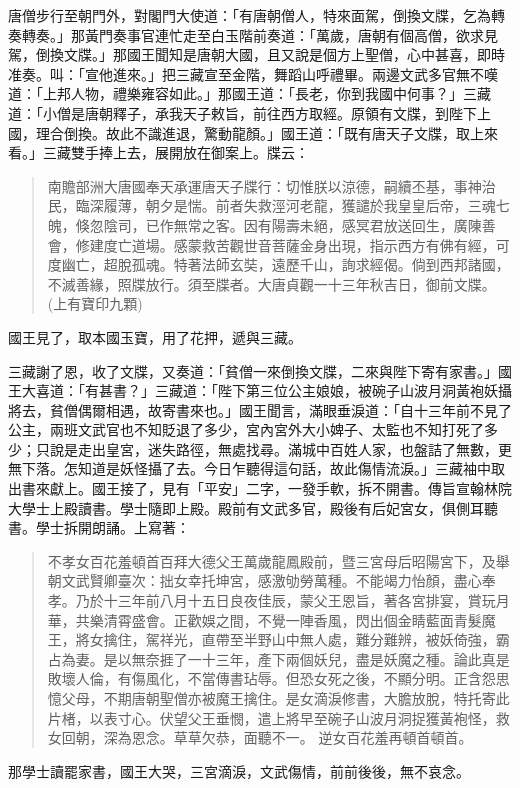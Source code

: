 唐僧步行至朝門外，對閣門大使道：「有唐朝僧人，特來面駕，倒換文牒，乞為轉奏轉奏。」那黃門奏事官連忙走至白玉階前奏道：「萬歲，唐朝有個高僧，欲求見駕，倒換文牒。」那國王聞知是唐朝大國，且又說是個方上聖僧，心中甚喜，即時准奏。叫：「宣他進來。」把三藏宣至金階，舞蹈山呼禮畢。兩邊文武多官無不嘆道：「上邦人物，禮樂雍容如此。」那國王道：「長老，你到我國中何事？」三藏道：「小僧是唐朝釋子，承我天子敕旨，前往西方取經。原領有文牒，到陛下上國，理合倒換。故此不識進退，驚動龍顏。」國王道：「既有唐天子文牒，取上來看。」三藏雙手捧上去，展開放在御案上。牒云：
\begin{quote}
南贍部洲大唐國奉天承運唐天子牒行：切惟朕以涼德，嗣續丕基，事神治民，臨深履薄，朝夕是惴。前者失救涇河老龍，獲譴於我皇皇后帝，三魂七魄，倏忽陰司，已作無常之客。因有陽壽未絕，感冥君放送回生，廣陳善會，修建度亡道場。感蒙救苦觀世音菩薩金身出現，指示西方有佛有經，可度幽亡，超脫孤魂。特著法師玄奘，遠歷千山，詢求經偈。倘到西邦諸國，不滅善緣，照牒放行。須至牒者。大唐貞觀一十三年秋吉日，御前文牒。(上有寶印九顆)
\end{quote}

國王見了，取本國玉寶，用了花押，遞與三藏。

三藏謝了恩，收了文牒，又奏道：「貧僧一來倒換文牒，二來與陛下寄有家書。」國王大喜道：「有甚書？」三藏道：「陛下第三位公主娘娘，被碗子山波月洞黃袍妖攝將去，貧僧偶爾相遇，故寄書來也。」國王聞言，滿眼垂淚道：「自十三年前不見了公主，兩班文武官也不知貶退了多少，宮內宮外大小婢子、太監也不知打死了多少；只說是走出皇宮，迷失路徑，無處找尋。滿城中百姓人家，也盤詰了無數，更無下落。怎知道是妖怪攝了去。今日乍聽得這句話，故此傷情流淚。」三藏袖中取出書來獻上。國王接了，見有「平安」二字，一發手軟，拆不開書。傳旨宣翰林院大學士上殿讀書。學士隨即上殿。殿前有文武多官，殿後有后妃宮女，俱側耳聽書。學士拆開朗誦。上寫著：
\begin{quote}
不孝女百花羞頓首百拜大德父王萬歲龍鳳殿前，暨三宮母后昭陽宮下，及舉朝文武賢卿臺次：拙女幸托坤宮，感激劬勞萬種。不能竭力怡顏，盡心奉孝。乃於十三年前八月十五日良夜佳辰，蒙父王恩旨，著各宮排宴，賞玩月華，共樂清霄盛會。正歡娛之間，不覺一陣香風，閃出個金睛藍面青髮魔王，將女擒住，駕祥光，直帶至半野山中無人處，難分難辨，被妖倚強，霸占為妻。是以無奈捱了一十三年，產下兩個妖兒，盡是妖魔之種。論此真是敗壞人倫，有傷風化，不當傳書玷辱。但恐女死之後，不顯分明。正含怨思憶父母，不期唐朝聖僧亦被魔王擒住。是女滴淚修書，大膽放脫，特托寄此片楮，以表寸心。伏望父王垂憫，遣上將早至碗子山波月洞捉獲黃袍怪，救女回朝，深為恩念。草草欠恭，面聽不一。
逆女百花羞再頓首頓首。
\end{quote}

那學士讀罷家書，國王大哭，三宮滴淚，文武傷情，前前後後，無不哀念。

